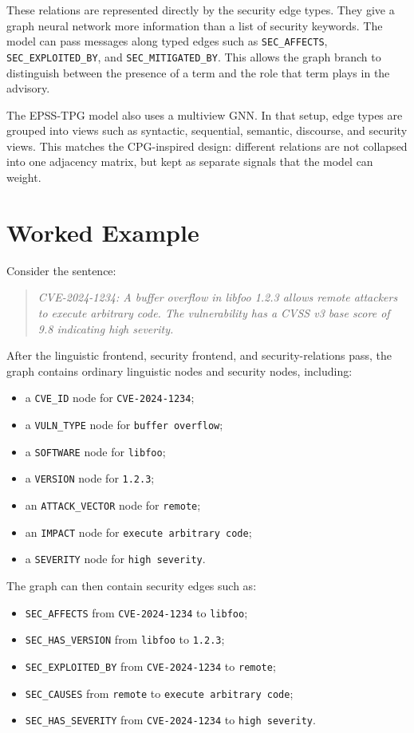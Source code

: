 \documentclass[11pt]{article}
\begin{document}
These relations are represented directly by the security edge types. They give
a graph neural network more information than a list of security keywords. The
model can pass messages along typed edges such as \texttt{SEC\_AFFECTS},
\texttt{SEC\_EXPLOITED\_BY}, and \texttt{SEC\_MITIGATED\_BY}. This allows the
graph branch to distinguish between the presence of a term and the role that
term plays in the advisory.

The EPSS-TPG model also uses a multiview GNN. In that setup, edge types are
grouped into views such as syntactic, sequential, semantic, discourse, and
security views. This matches the CPG-inspired design: different relations are
not collapsed into one adjacency matrix, but kept as separate signals that the
model can weight.

\section{Worked Example}

Consider the sentence:

\begin{quote}
\textit{CVE-2024-1234: A buffer overflow in libfoo 1.2.3 allows remote
attackers to execute arbitrary code. The vulnerability has a CVSS v3 base
score of 9.8 indicating high severity.}
\end{quote}

After the linguistic frontend, security frontend, and security-relations pass,
the graph contains ordinary linguistic nodes and security nodes, including:

\begin{itemize}
    \item a \texttt{CVE\_ID} node for \texttt{CVE-2024-1234};
    \item a \texttt{VULN\_TYPE} node for \texttt{buffer overflow};
    \item a \texttt{SOFTWARE} node for \texttt{libfoo};
    \item a \texttt{VERSION} node for \texttt{1.2.3};
    \item an \texttt{ATTACK\_VECTOR} node for \texttt{remote};
    \item an \texttt{IMPACT} node for \texttt{execute arbitrary code};
    \item a \texttt{SEVERITY} node for \texttt{high severity}.
\end{itemize}

The graph can then contain security edges such as:

\begin{itemize}
    \item \texttt{SEC\_AFFECTS} from \texttt{CVE-2024-1234} to
    \texttt{libfoo};
    \item \texttt{SEC\_HAS\_VERSION} from \texttt{libfoo} to
    \texttt{1.2.3};
    \item \texttt{SEC\_EXPLOITED\_BY} from \texttt{CVE-2024-1234} to
    \texttt{remote};
    \item \texttt{SEC\_CAUSES} from \texttt{remote} to
    \texttt{execute arbitrary code};
    \item \texttt{SEC\_HAS\_SEVERITY} from \texttt{CVE-2024-1234} to
    \texttt{high severity}.
\end{itemize}
\end{document}

